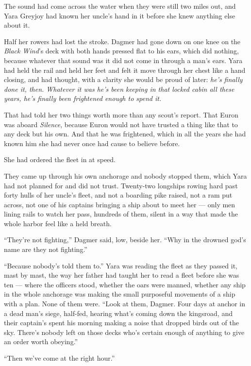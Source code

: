 The sound had come across the water when they were still two miles out, and Yara Greyjoy had known her uncle’s hand in it before she knew anything else about it.

Half her rowers had lost the stroke. Dagmer had gone down on one knee on the \textit{Black Wind}’s deck with both hands pressed flat to his ears, which did nothing, because whatever that sound was it did not come in through a man’s ears. Yara had held the rail and held her feet and felt it move through her chest like a hand closing, and had thought, with a clarity she would be proud of later: \textit{he’s finally done it, then. Whatever it was he’s been keeping in that locked cabin all these years, he’s finally been frightened enough to spend it.}

That had told her two things worth more than any scout’s report. That Euron was aboard \textit{Silence}, because Euron would not have trusted a thing like that to any deck but his own. And that he was frightened, which in all the years she had known him she had never once had cause to believe before.

She had ordered the fleet in at speed.

\sceneBreak

They came up through his own anchorage and nobody stopped them, which Yara had not planned for and did not trust. Twenty-two longships rowing hard past forty hulls of her uncle’s fleet, and not a boarding pike raised, not a ram put across, not one of his captains bringing a ship about to meet her — only men lining rails to watch her pass, hundreds of them, silent in a way that made the whole harbor feel like a held breath.

“They’re not fighting,” Dagmer said, low, beside her. “Why in the drowned god’s name are they not fighting.”

“Because nobody’s told them to.” Yara was reading the fleet as they passed it, mast by mast, the way her father had taught her to read a fleet before she was ten — where the officers stood, whether the oars were manned, whether any ship in the whole anchorage was making the small purposeful movements of a ship with a plan. None of them were. “Look at them, Dagmer. Four days at anchor in a dead man’s siege, half-fed, hearing what’s coming down the kingsroad, and their captain’s spent his morning making a noise that dropped birds out of the sky. There’s nobody left on those decks who’s certain enough of anything to give an order worth obeying.”

“Then we’ve come at the right hour.”

